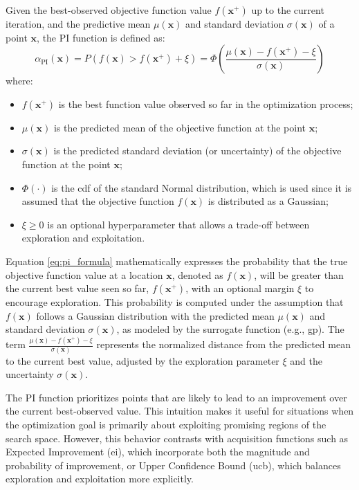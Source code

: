 Given the best-observed objective function value \(f(\mathbf{x}^+)\) up to the current iteration, and the predictive mean \(\mu(\mathbf{x})\) and standard deviation \(\sigma(\mathbf{x})\) of a point \(\mathbf{x}\), the \ac{PI} function is defined as:
\begin{equation}
\alpha_{\text{PI}}(\mathbf{x}) = P(f(\mathbf{x}) > f(\mathbf{x}^+) + \xi) = \Phi\left( \frac{\mu(\mathbf{x}) - f(\mathbf{x}^+) - \xi}{\sigma(\mathbf{x})} \right)
\label{eq:pi_formula}
\end{equation}
where:
\begin{itemize}
    \item \(f(\mathbf{x}^+)\) is the best function value observed so far in the optimization process;
    \item \(\mu(\mathbf{x})\) is the predicted mean of the objective function at the point \(\mathbf{x}\);
    \item \(\sigma(\mathbf{x})\) is the predicted standard deviation (or uncertainty) of the objective function at the point \(\mathbf{x}\);
    \item \(\Phi(\cdot)\) is the \ac{cdf} of the standard Normal distribution, which is used since it is assumed that the objective function \(f(\mathbf{x})\) is distributed as a Gaussian;
    \item \(\xi \geq 0\) is an optional hyperparameter that allows a trade-off between exploration and exploitation.
\end{itemize}

Equation \eqref{eq:pi_formula} mathematically expresses the probability that the true objective function value at a location \(\mathbf{x}\), denoted as \(f(\mathbf{x})\), will be greater than the current best value seen so far, \(f(\mathbf{x}^+)\), with an optional margin \(\xi\) to encourage exploration. This probability is computed under the assumption that \(f(\mathbf{x})\) follows a Gaussian distribution with the predicted mean \(\mu(\mathbf{x})\) and standard deviation \(\sigma(\mathbf{x})\), as modeled by the surrogate function (e.g., \ac{gp}). The term \(\frac{\mu(\mathbf{x}) - f(\mathbf{x}^+) - \xi}{\sigma(\mathbf{x})}\) represents the normalized distance from the predicted mean to the current best value, adjusted by the exploration parameter \(\xi\) and the uncertainty \(\sigma(\mathbf{x})\).

The \ac{PI} function prioritizes points that are likely to lead to an improvement over the current best-observed value. This intuition makes it useful for situations when the optimization goal is primarily about exploiting promising regions of the search space. However, this behavior contrasts with acquisition functions such as Expected Improvement (\ac{ei}), which incorporate both the magnitude and probability of improvement, or Upper Confidence Bound (\ac{ucb}), which balances exploration and exploitation more explicitly.


